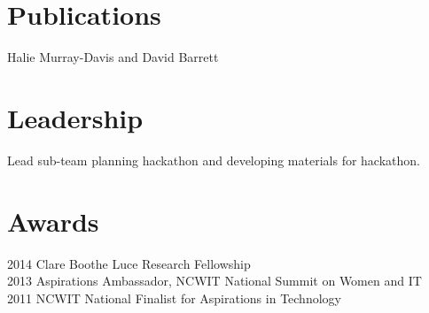 \documentclass[]{deedy-resume-openfont}
\begin{document}
\begin{minipage}[t]{0.66\textwidth}

\section{Publications}
Halie Murray-Davis and David Barrett \\ 
\sectionsep



\section{Leadership} 
Lead sub-team planning hackathon and developing materials for hackathon.
\sectionsep



\section{Awards} 
2014	      Clare Boothe Luce Research Fellowship\\
2013	      Aspirations Ambassador, NCWIT National Summit on Women and IT\\
2011          NCWIT National Finalist for Aspirations in Technology
\sectionsep



\end{minipage} 
\end{document}
